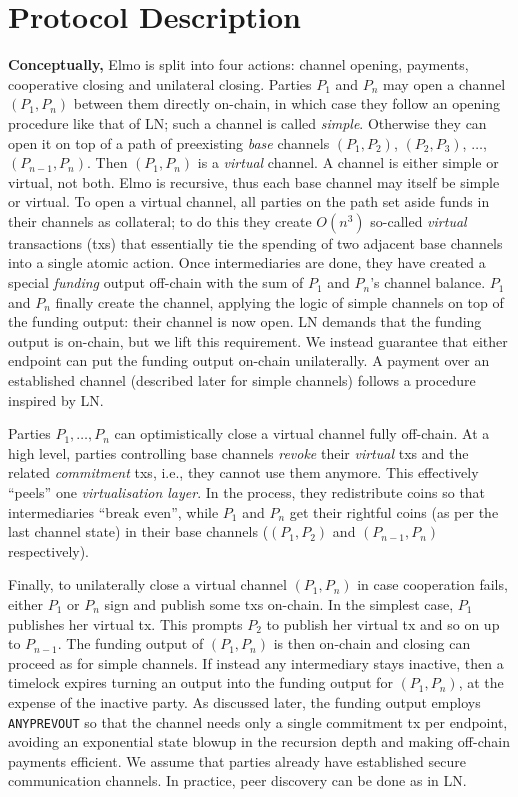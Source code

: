 \section{Protocol Description}
  \textbf{Conceptually,} Elmo is split into four actions: channel opening,
  payments, cooperative closing and unilateral closing. Parties $P_1$ and $P_n$
  may open a channel $(P_1, P_n)$ between them directly on-chain, in which case
  they follow an opening procedure like that of LN; such a channel is called
  \emph{simple}.
  Otherwise they can open it on top of a path
  of preexisting \emph{base} channels $(P_1, P_2)$, $(P_2, P_3)$, $\dots$,
  $(P_{n-1}, P_{n})$. Then $(P_1, P_n)$ is a \emph{virtual}
  channel. A channel is either simple or virtual, not both. Elmo is
  recursive, thus each base channel may itself be simple or
  virtual. To open a virtual
  channel, all parties on the
  path set aside funds in their channels as
  collateral; to do this
  they create $O(n^3)$ so-called \emph{virtual} transactions (txs) that essentially
  tie the spending of two adjacent base channels into a single atomic action.
  Once intermediaries are done, they have created a special \emph{funding}
  output off-chain with the sum of $P_1$ and $P_n$'s channel
  balance. $P_1$ and $P_n$
  finally create the channel, applying the logic of simple channels on top of
  the funding output: their channel is now open. LN demands that the funding
  output is on-chain, but we lift this requirement. We instead guarantee that
  either endpoint can put the funding output on-chain unilaterally.
  A payment over an established channel (described later for simple channels) follows a procedure inspired by
  LN.

  Parties $P_1, \dots, P_n$ can optimistically close a virtual channel
  fully off-chain. At a high
  level, parties controlling base channels \emph{revoke} their \emph{virtual}
  txs and the related \emph{commitment} txs, i.e., they cannot use them
  anymore. This effectively ``peels'' one \emph{virtualisation layer}.
  In the process, they redistribute coins so that intermediaries ``break even'',
  while $P_1$
  and $P_n$ get their rightful coins (as per the last channel
  state) in their base channels ($(P_1, P_2)$ and $(P_{n-1}, P_n)$ respectively).

  Finally, to unilaterally close a virtual channel $(P_1, P_n)$
  in case cooperation fails,
  either $P_1$ or $P_n$ sign and publish some
  txs on-chain. In the simplest case, $P_1$ publishes her virtual tx. This
  prompts $P_2$ to publish her
  virtual tx and so on up to $P_{n-1}$. The
  funding output of $(P_1, P_n)$ is then on-chain and closing can
  proceed as for simple channels. If instead any intermediary stays inactive, then a timelock
  expires turning an output into the funding output for $(P_1,
  P_n)$, at
  the expense of the inactive party. As discussed later, the funding output
  employs \texttt{ANYPREVOUT} so that the channel needs only a
  single commitment tx per endpoint, avoiding an exponential state blowup in the
  recursion depth and making off-chain payments efficient. We assume that
  parties already have established secure communication channels.
  In practice, peer discovery can be done as in LN.

